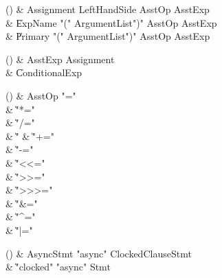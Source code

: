 \begin{bbgrammarappendix}

() & Assignment \label{prod:Assignment}  \: LeftHandSide AsstOp AsstExp  \\

 &    \| ExpName  \xcd"(" ArgumentList\opt \xcd")" AsstOp AsstExp \\
 &    \| Primary  \xcd"(" ArgumentList\opt \xcd")" AsstOp AsstExp \\

\end{bbgrammarappendix}

\begin{bbgrammarappendix}

() & AsstExp \label{prod:AsstExp}  \: Assignment  \\

 &    \| ConditionalExp \\

\end{bbgrammarappendix}

\begin{bbgrammarappendix}

() & AsstOp \label{prod:AsstOp}  \: \xcd"="  \\

 &    \| \xcd"*=" \\
 &    \| \xcd"/=" \\
 &    \| \xcd"%
 &    \| \xcd"+=" \\
 &    \| \xcd"-=" \\
 &    \| \xcd"<<=" \\
 &    \| \xcd">>=" \\
 &    \| \xcd">>>=" \\
 &    \| \xcd"&=" \\
 &    \| \xcd"^=" \\
 &    \| \xcd"|=" \\

\end{bbgrammarappendix}

\begin{bbgrammarappendix}

() & AsyncStmt \label{prod:AsyncStmt}  \: \xcd"async" ClockedClause\opt Stmt  \\

 &    \| \xcd"clocked" \xcd"async" Stmt \\

\end{bbgrammarappendix}

